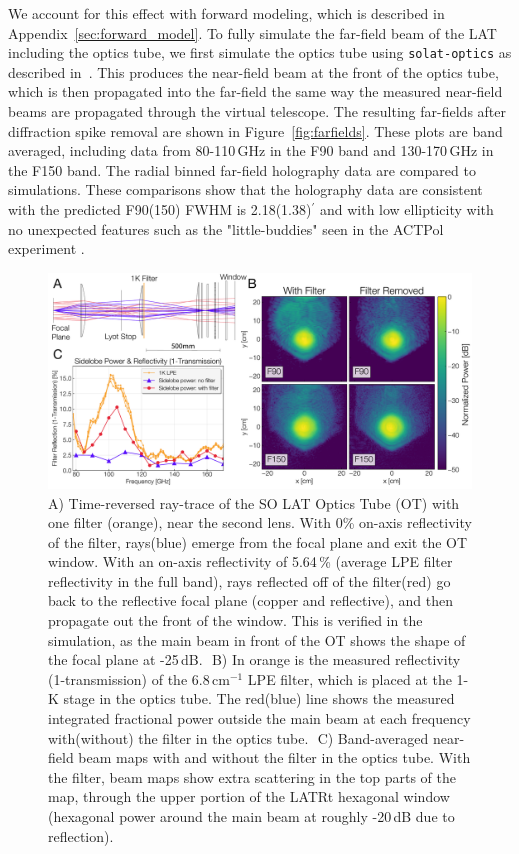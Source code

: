 We account for this effect with forward modeling, which is described in Appendix~\ref{sec:forward_model}.  To fully simulate the far-field beam of the LAT including the optics tube, we first simulate the optics tube using \verb|solat-optics| as described in~\cite{holog_sim_model}.  This produces the near-field beam at the front of the optics tube, which is then propagated into the far-field the same way the measured near-field beams are propagated through the virtual telescope.  The resulting far-fields after diffraction spike removal are shown in Figure~\ref{fig:farfields}.  These plots are band averaged, including data from 80-110\,GHz in the F90 band and 130-170\,GHz in the F150 band.  The radial binned far-field holography data are compared to simulations.  These comparisons show that the holography data are consistent with the predicted F90(150) FWHM is 2.18(1.38)$^{\prime}$ and with low ellipticity with no unexpected features such as the "little-buddies" seen in the ACTPol experiment \cite{2021arXiv211212226L,Gudmundsson:21}.

\begin{figure}[t]
    \centering
    \includegraphics[width = \textwidth]{Figures/filter_fig.pdf}
    \caption{A) Time-reversed ray-trace of the SO LAT Optics Tube (OT) with one filter (orange), near the second lens.  With 0\% on-axis reflectivity of the filter, rays(blue) emerge from the focal plane and exit the OT window.  With an on-axis reflectivity of 5.64\,\% (average LPE filter reflectivity in the full band), rays reflected off of the filter(red) go back to the reflective focal plane (copper and reflective), and then propagate out the front of the window.  This is verified in the simulation, as the main beam in front of the OT shows the shape of the focal plane at -25\,dB.  \,\,B) In orange is the measured reflectivity (1-transmission) of the 6.8\,cm$^{-1}$ LPE filter, which is placed at the 1-K stage in the optics tube.  The red(blue) line shows the measured integrated fractional power outside the main beam at each frequency with(without) the filter in the optics tube.  \,\,C) Band-averaged near-field beam maps with and without the filter in the optics tube.  With the filter, beam maps show extra scattering in the top parts of the map, through the upper portion of the LATRt hexagonal window (hexagonal power around the main beam at roughly -20\,dB due to reflection).}
    \label{fig:filter_info}
\end{figure}
